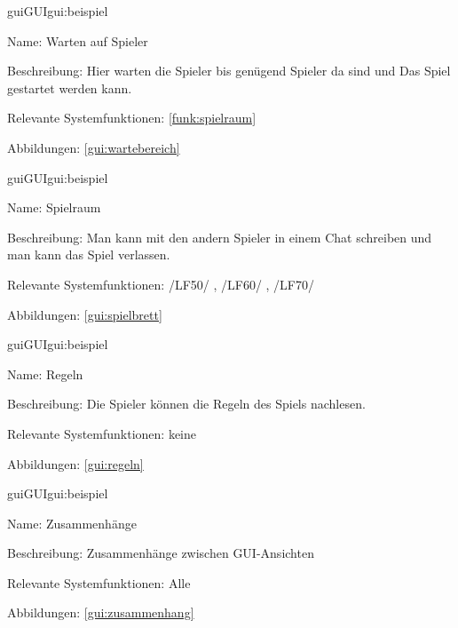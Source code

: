 \begin{description}[leftmargin=5em, style=sameline]	
	\begin{lhp}{gui}{GUI}{gui:beispiel}
		\item[Name:] Warten auf Spieler
		\item[Beschreibung:]  Hier warten die Spieler bis genügend Spieler da sind und Das Spiel gestartet werden kann.
		\item[Relevante Systemfunktionen:] \ref{funk:spielraum}
		\item[Abbildungen:] \ref{gui:wartebereich}
	\end{lhp}
\end{description}

\begin{description}[leftmargin=5em, style=sameline]	
	\begin{lhp}{gui}{GUI}{gui:beispiel}
		\item[Name:] Spielraum 
		\item[Beschreibung:] Man kann mit den andern Spieler in einem Chat schreiben und man kann das Spiel verlassen.
		\item[Relevante Systemfunktionen:] /LF50/ , /LF60/ , /LF70/
		\item[Abbildungen:] \ref{gui:spielbrett}
	\end{lhp}
\end{description}

\begin{description}[leftmargin=5em, style=sameline]	
	\begin{lhp}{gui}{GUI}{gui:beispiel}
		\item[Name:] Regeln
		\item[Beschreibung:] Die Spieler können die Regeln des Spiels nachlesen.
		\item[Relevante Systemfunktionen:] keine
		\item[Abbildungen:] \ref{gui:regeln}
	\end{lhp}
\end{description}

\begin{description}[leftmargin=5em, style=sameline]	
	\begin{lhp}{gui}{GUI}{gui:beispiel}
		\item[Name:] Zusammenhänge
		\item[Beschreibung:] Zusammenhänge zwischen GUI-Ansichten
		\item[Relevante Systemfunktionen:] Alle
		\item[Abbildungen:] \ref{gui:zusammenhang}
	\end{lhp}
\end{description}



